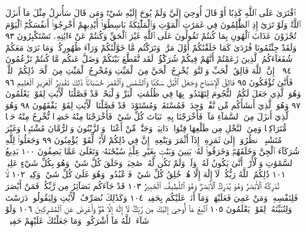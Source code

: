 ٱفْتَرَىٰ عَلَى ٱللَّهِ كَذِبًا أَوْ قَالَ أُوحِيَ إِلَيَّ وَلَمْ يُوحَ إِلَيْهِ شَيْءࣱ
وَمَن قَالَ سَأُنزِلُ مِثْلَ مَآ أَنزَلَ ٱللَّهُۗ وَلَوْ تَرَىٰٓ إِذِ ٱلظَّٰلِمُونَ فِي
غَمَرَٰتِ ٱلْمَوْتِ وَٱلْمَلَٰٓئِكَةُ بَاسِطُوٓا۟ أَيْدِيهِمْ أَخْرِجُوٓا۟ أَنفُسَكُمُۖ
ٱلْيَوْمَ تُجْزَوْنَ عَذَابَ ٱلْهُونِ بِمَا كُنتُمْ تَقُولُونَ عَلَى ٱللَّهِ غَيْرَ
ٱلْحَقِّ وَكُنتُمْ عَنْ ءَايَٰتِهِۦ تَسْتَكْبِرُونَ ٩٣ وَلَقَدْ جِئْتُمُونَا
فُرَٰدَىٰ كَمَا خَلَقْنَٰكُمْ أَوَّلَ مَرَّةࣲ وَتَرَكْتُم مَّا خَوَّلْنَٰكُمْ وَرَآءَ
ظُهُورِكُمْۖ وَمَا نَرَىٰ مَعَكُمْ شُفَعَآءَكُمُ ٱلَّذِينَ زَعَمْتُمْ أَنَّهُمْ فِيكُمْ
شُرَكَٰٓؤُا۟ۚ لَقَد تَّقَطَّعَ بَيْنَكُمْ وَضَلَّ عَنكُم مَّا كُنتُمْ تَزْعُمُونَ ٩٤
۞ إِنَّ ٱللَّهَ فَالِقُ ٱلْحَبِّ وَٱلنَّوَىٰۖ يُخْرِجُ ٱلْحَيَّ مِنَ ٱلْمَيِّتِ وَمُخْرِجُ
ٱلْمَيِّتِ مِنَ ٱلْحَيِّۚ ذَٰلِكُمُ ٱللَّهُۖ فَأَنَّىٰ تُؤْفَكُونَ ٩٥ فَالِقُ ٱلْإِصْبَاحِ
وَجَعَلَ ٱلَّيْلَ سَكَنࣰا وَٱلشَّمْسَ وَٱلْقَمَرَ حُسْبَانࣰاۚ ذَٰلِكَ تَقْدِيرُ
ٱلْعَزِيزِ ٱلْعَلِيمِ ٩٦ وَهُوَ ٱلَّذِي جَعَلَ لَكُمُ ٱلنُّجُومَ لِتَهْتَدُوا۟
بِهَا فِي ظُلُمَٰتِ ٱلْبَرِّ وَٱلْبَحْرِۗ قَدْ فَصَّلْنَا ٱلْأٓيَٰتِ لِقَوْمࣲ يَعْلَمُونَ ٩٧
وَهُوَ ٱلَّذِيٓ أَنشَأَكُم مِّن نَّفْسࣲ وَٰحِدَةࣲ فَمُسْتَقَرࣱّ وَمُسْتَوْدَعࣱۗ
قَدْ فَصَّلْنَا ٱلْأٓيَٰتِ لِقَوْمࣲ يَفْقَهُونَ ٩٨ وَهُوَ ٱلَّذِيٓ أَنزَلَ مِنَ
ٱلسَّمَآءِ مَآءࣰ فَأَخْرَجْنَا بِهِۦ نَبَاتَ كُلِّ شَيْءࣲ فَأَخْرَجْنَا مِنْهُ
خَضِرࣰا نُّخْرِجُ مِنْهُ حَبࣰّا مُّتَرَاكِبࣰا وَمِنَ ٱلنَّخْلِ مِن طَلْعِهَا قِنْوَانࣱ
دَانِيَةࣱ وَجَنَّٰتࣲ مِّنْ أَعْنَابࣲ وَٱلزَّيْتُونَ وَٱلرُّمَّانَ مُشْتَبِهࣰا وَغَيْرَ
مُتَشَٰبِهٍۗ ٱنظُرُوٓا۟ إِلَىٰ ثَمَرِهِۦٓ إِذَآ أَثْمَرَ وَيَنْعِهِۦٓۚ إِنَّ فِي ذَٰلِكُمْ
لَأٓيَٰتࣲ لِّقَوْمࣲ يُؤْمِنُونَ ٩٩ وَجَعَلُوا۟ لِلَّهِ شُرَكَآءَ ٱلْجِنَّ وَخَلَقَهُمْۖ
وَخَرَقُوا۟ لَهُۥ بَنِينَ وَبَنَٰتِۭ بِغَيْرِ عِلْمࣲۚ سُبْحَٰنَهُۥ وَتَعَٰلَىٰ عَمَّا يَصِفُونَ ١٠٠
بَدِيعُ ٱلسَّمَٰوَٰتِ وَٱلْأَرْضِۖ أَنَّىٰ يَكُونُ لَهُۥ وَلَدࣱ وَلَمْ تَكُن لَّهُۥ
صَٰحِبَةࣱۖ وَخَلَقَ كُلَّ شَيْءࣲۖ وَهُوَ بِكُلِّ شَيْءٍ عَلِيمࣱ ١٠١
ذَٰلِكُمُ ٱللَّهُ رَبُّكُمْۖ لَآ إِلَٰهَ إِلَّا هُوَۖ خَٰلِقُ كُلِّ شَيْءࣲ فَٱعْبُدُوهُۚ
وَهُوَ عَلَىٰ كُلِّ شَيْءࣲ وَكِيلࣱ ١٠٢ لَّا تُدْرِكُهُ ٱلْأَبْصَٰرُ وَهُوَ
يُدْرِكُ ٱلْأَبْصَٰرَۖ وَهُوَ ٱللَّطِيفُ ٱلْخَبِيرُ ١٠٣ قَدْ جَآءَكُم
بَصَآئِرُ مِن رَّبِّكُمْۖ فَمَنْ أَبْصَرَ فَلِنَفْسِهِۦۖ وَمَنْ عَمِيَ فَعَلَيْهَاۚ
وَمَآ أَنَا۠ عَلَيْكُم بِحَفِيظࣲ ١٠٤ وَكَذَٰلِكَ نُصَرِّفُ ٱلْأٓيَٰتِ
وَلِيَقُولُوا۟ دَرَسْتَ وَلِنُبَيِّنَهُۥ لِقَوْمࣲ يَعْلَمُونَ ١٠٥ ٱتَّبِعْ
مَآ أُوحِيَ إِلَيْكَ مِن رَّبِّكَۖ لَآ إِلَٰهَ إِلَّا هُوَۖ وَأَعْرِضْ عَنِ ٱلْمُشْرِكِينَ ١٠٦
وَلَوْ شَآءَ ٱللَّهُ مَآ أَشْرَكُوا۟ۗ وَمَا جَعَلْنَٰكَ عَلَيْهِمْ حَفِيظࣰاۖ
